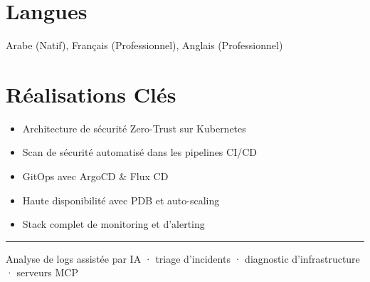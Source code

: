 \documentclass[10pt,a4paper]{article}
\begin{document}
\section*{Langues}
Arabe (Natif), Français (Professionnel), Anglais (Professionnel)\par
\section*{Réalisations Clés}
\begin{itemize}
  \item Architecture de sécurité Zero-Trust sur Kubernetes
  \item Scan de sécurité automatisé dans les pipelines CI/CD
  \item GitOps avec ArgoCD \& Flux CD
  \item Haute disponibilité avec PDB et auto-scaling
  \item Stack complet de monitoring et d'alerting
\end{itemize}
\vspace{6pt}\hrule\vspace{3pt}
{\footnotesize\color{graytext} Analyse de logs assistée par IA · triage d'incidents · diagnostic d'infrastructure · serveurs MCP\par}
\end{document}
